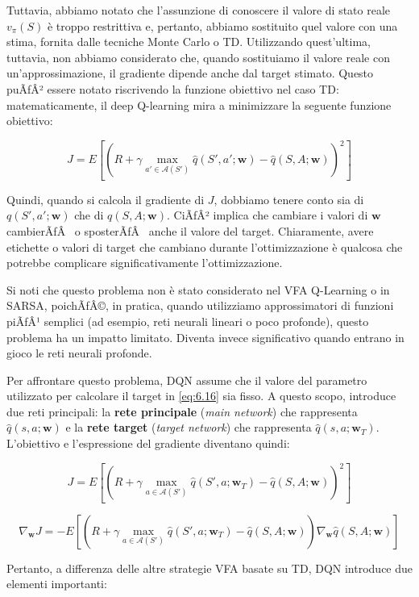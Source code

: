 ﻿\documentclass[11pt, a4paper]{report}
\begin{document}
Tuttavia, abbiamo notato che l'assunzione di conoscere il valore di stato reale $v_\pi(S)$ è troppo restrittiva e, pertanto, abbiamo sostituito quel valore con una stima, fornita dalle tecniche Monte Carlo o TD. Utilizzando quest'ultima, tuttavia, non abbiamo considerato che, quando sostituiamo il valore reale con un'approssimazione, il gradiente dipende anche dal target stimato. Questo puÃƒÂ² essere notato riscrivendo la funzione obiettivo nel caso TD: matematicamente, il deep Q-learning mira a minimizzare la seguente funzione obiettivo:

\[
J = E \left[ \left( R + \gamma \max_{a' \in \mathcal{A}(S')} \hat{q}(S', a'; \bm{w}) - \hat{q}(S, A; \bm{w}) \right)^2 \right] \tag{6.16}
\]

Quindi, quando si calcola il gradiente di $J$, dobbiamo tenere conto sia di $q(S', a'; \bm{w})$ che di $q(S, A; \bm{w})$. CiÃƒÂ² implica che cambiare i valori di $\bm{w}$ cambierÃƒÂ  o sposterÃƒÂ  anche il valore del target. Chiaramente, avere etichette o valori di target che cambiano durante l'ottimizzazione è qualcosa che potrebbe complicare significativamente l'ottimizzazione.

Si noti che questo problema non è stato considerato nel VFA Q-Learning o in SARSA, poichÃƒÂ©, in pratica, quando utilizziamo approssimatori di funzioni piÃƒÂ¹ semplici (ad esempio, reti neurali lineari o poco profonde), questo problema ha un impatto limitato. Diventa invece significativo quando entrano in gioco le reti neurali profonde.

Per affrontare questo problema, DQN assume che il valore del parametro utilizzato per calcolare il target in \eqref{eq:6.16} sia fisso. A questo scopo, introduce due reti principali: la \textbf{rete principale} (\emph{main network}) che rappresenta $\hat{q}(s, a; \bm{w})$ e la \textbf{rete target} (\emph{target network}) che rappresenta $\hat{q}(s, a; \bm{w}_T)$. L'obiettivo e l'espressione del gradiente diventano quindi:

\[
J = E \left[ \left( R + \gamma \max_{a \in \mathcal{A}(S')} \hat{q}(S', a; \bm{w}_T) - \hat{q}(S, A; \bm{w}) \right)^2 \right] \tag{6.17}
\]

\newpage

\[
\nabla_{\bm{w}} J = -E \left[ \left( R + \gamma \max_{a \in \mathcal{A}(S')} \hat{q}(S', a; \bm{w}_T) - \hat{q}(S, A; \bm{w}) \right) \nabla_{\bm{w}} \hat{q}(S, A; \bm{w}) \right] \tag{6.18}
\]

Pertanto, a differenza delle altre strategie VFA basate su TD, DQN introduce due elementi importanti:
\end{document}
